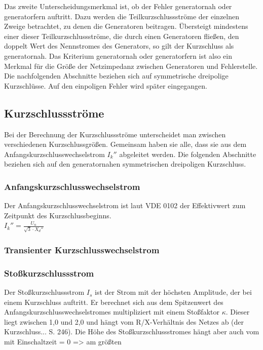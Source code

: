 \documentclass{scrartcl}
\begin{document}
\begin{onehalfspace}
Das zweite Unterscheidungsmerkmal ist, ob der Fehler \glqq generatornah \grqq{} oder \glqq generatorfern\grqq{} auftritt. Dazu werden die Teilkurzschlussströme der einzelnen Zweige betrachtet, zu denen die Generatoren beitragen. Übersteigt mindestens einer dieser Teilkurzschlussströme, die durch einen Generatoren fließen, den doppelt Wert des Nennstromes des Generators, so gilt der Kurzschluss als generatornah. Das Kriterium \glqq generatornah oder generatorfern\grqq{} ist also ein Merkmal für die Größe der Netzimpedanz zwischen Generatoren und Fehlerstelle. \\
Die nachfolgenden Abschnitte beziehen sich auf symmetrische dreipolige Kurzschlüsse. Auf den einpoligen Fehler wird später eingegangen.

\subsection{Kurzschlussströme}
Bei der Berechnung der Kurzschlussströme unterscheidet man zwischen verschiedenen Kurzschlussgrößen. Gemeinsam haben sie alle, dass sie aus dem Anfangskurzschlusswechselstrom $I_k''$ abgeleitet werden. Die folgenden Abschnitte beziehen sich auf den generatornahen symmetrischen dreipoligen Kurzschluss.

\subsubsection{Anfangskurzschlusswechselstrom}
Der Anfangskurzschlusswechselstrom ist laut VDE 0102 der \glqq Effektivwert zum Zeitpunkt des Kurzschlussbeginns\grqq. \\
$I_k'' = \frac{U_n}{\sqrt{3} \cdot X_d''} $

\subsubsection{Transienter Kurzschlusswechselstrom}

\subsubsection{Stoßkurzschlussstrom}
Der Stoßkurzschlussstrom $I_s$ ist der Strom mit der höchsten Amplitude, der bei einem Kurzschluss auftritt. Er berechnet sich aus dem Spitzenwert des Anfangskurzschlusswechselstromes multipliziert mit einem Stoßfaktor $\kappa$. Dieser liegt zwischen 1,0 und 2,0 und hängt vom R/X-Verhältnis des Netzes ab (der Kurzschluss... S. 246). Die Höhe des Stoßkurzschlussstromes hängt aber auch vom \\ mit Einschaltzeit = 0 => am größten


\end{onehalfspace}
\end{document}
